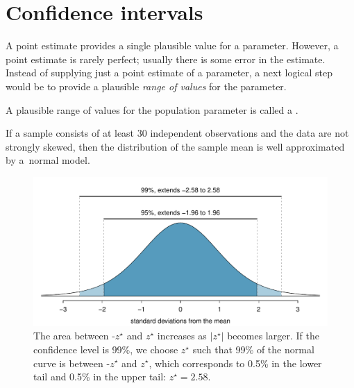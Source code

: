 

\section{Confidence intervals}
\label{confidenceIntervals}


A point estimate provides a single plausible value for a parameter. However, a point estimate is rarely perfect; usually there is some error in the estimate. Instead of supplying just a point estimate of a parameter, a next logical step would be to provide a plausible \emph{range of values} for the parameter.


A plausible range of values for the population parameter is called a .



\begin{termBox}{
If a sample consists of at least 30 independent observations and the data are not strongly skewed, then the distribution of the sample mean is well approximated by a~normal model.}
\end{termBox}




\begin{figure}%
\centering
\includegraphics[width=\textwidth]{ch_inference_foundations/figures/choosingZForCI/choosingZForCI}
\caption{The area between -$z^{\star}$ and $z^{\star}$ increases as $|z^{\star}|$ becomes larger. If the confidence level is 99\%, we choose $z^{\star}$ such that 99\% of the normal curve is between -$z^{\star}$ and $z^{\star}$, which corresponds to 0.5\% in the lower tail and 0.5\% in the upper tail: $z^{\star}=2.58$.}
\label{choosingZForCI}
\end{figure}

